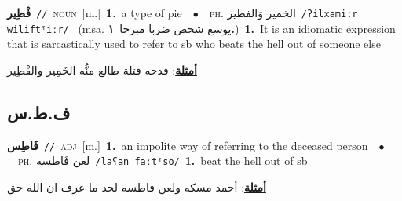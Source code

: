 \documentclass[10pt,a4paper,twoside]{article} %
\begin{document}
\begin{multicols}{2}
{\setlength\topsep{0pt}\textbf{\foreignlanguage{arabic}{فْطِير}}\ {\color{gray}\texttt{//}\color{black}}\ \textsc{noun}\ [m.]\ \textbf{1.}~a type of pie\ \ $\bullet$\ \ \textsc{ph.} \color{gray} \foreignlanguage{arabic}{الخمير وَالفطير}\color{black}\ {\color{gray}\texttt{/{\sffamily ʔilxamiːr wiliftˤiːr}/}\color{black}}\ \color{gray} (msa. \foreignlanguage{arabic}{يوسع شخص ضربا مبرحا}~\foreignlanguage{arabic}{\textbf{١.}})\color{black}\ \textbf{1.}~It is an idiomatic expression that is sarcastically used to refer to sb who beats the hell out of someone else\  \begin{flushright}\color{gray}\foreignlanguage{arabic}{\textbf{\underline{\foreignlanguage{arabic}{أمثلة}}}: قدحه قتلة طالع منُّه الخَمِير والفْطِير}\end{flushright}\color{black}} \vspace{2mm}

\vspace{-3mm}
\subsection*{\color{blue}\foreignlanguage{arabic}{ف.ط.س}\color{blue}{}} 

{\setlength\topsep{0pt}\textbf{\foreignlanguage{arabic}{فَاطِس}}\ {\color{gray}\texttt{//}\color{black}}\ \textsc{adj}\ [m.]\ \textbf{1.}~an impolite way of referring to the deceased person\ \ $\bullet$\ \ \textsc{ph.} \color{gray} \foreignlanguage{arabic}{لعن فَاطسه}\color{black}\ {\color{gray}\texttt{/{\sffamily laʕan faːtˤso}/}\color{black}}\ \textbf{1.}~beat the hell out of sb\  \begin{flushright}\color{gray}\foreignlanguage{arabic}{\textbf{\underline{\foreignlanguage{arabic}{أمثلة}}}: أحمد مسكه ولعن فاطسه لحد ما عرف ان الله حق}\end{flushright}\color{black}} \vspace{2mm}


\end{multicols}
\end{document}
